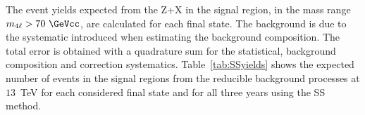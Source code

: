 The event yields expected from the Z+X in the signal region, in the mass range  $m_{4 \ell} > 70~\GeVcc$, are calculated for each final state.
The background is due to the systematic introduced when estimating the background composition. 
The total error is obtained with a quadrature sum for the statistical, background composition and correction systematics. 
Table~\ref{tab:SSyields} shows the expected number of events in the signal regions 
from the reducible background processes at $13$~TeV for each considered final state 
and for all three years using the SS method.
%
%

